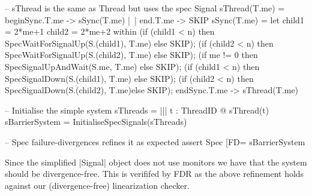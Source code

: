 \begin{cspm}[caption={The implementation of the {\scalastyle Barrier} based on }]
-- sThread is the same as Thread but uses the spec Signal
sThread(T.me) = beginSync.T.me -> sSync(T.me) |~| end.T.me -> SKIP
sSync(T.me) = 
  let child1 = 2*me+1 
      child2 = 2*me+2
  within (if (child1 < n) then SpecWaitForSignalUp(S.(child1), T.me) else SKIP);
        (if (child2 < n) then SpecWaitForSignalUp(S.(child2), T.me) else SKIP);
        (if me != 0 then SpecSignalUpAndWait(S.me, T.me) else SKIP);
        (if (child1 < n) then SpecSignalDown(S.(child1), T.me) else SKIP);
        (if (child2 < n) then SpecSignalDown(S.(child2), T.me)else SKIP);
        endSync.T.me -> sThread(T.me)

-- Initialise the simple system
sThreads = ||| t : ThreadID @ sThread(t)     
sBarrierSystem = InitialiseSpecSignals(sThreads)

-- Spec failure-divergences refines it as expected
assert Spec [FD= sBarrierSystem
\end{cspm}

Since the simplified |Signal| object does not use monitors we have that the system should be divergence-free. This is verififed by FDR as the above refinement holds against our (divergence-free) linearization checker.









